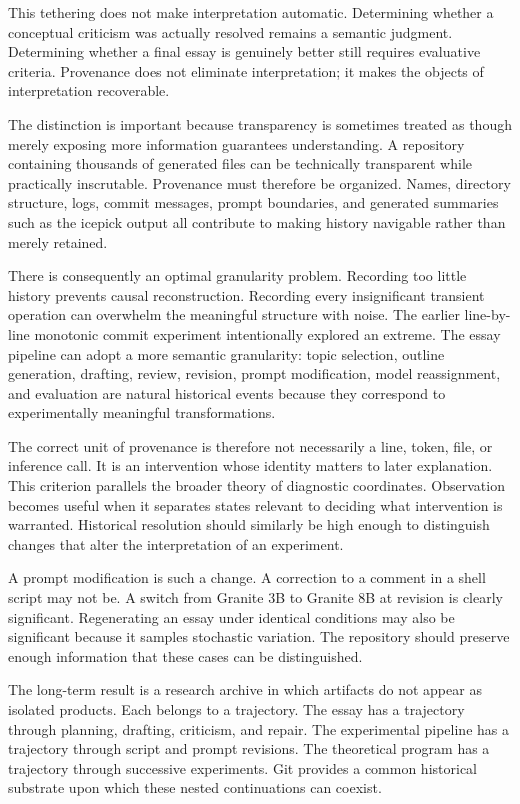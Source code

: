 \documentclass[11pt]{article}
\begin{document}
This tethering does not make interpretation automatic. Determining whether a conceptual criticism was actually resolved remains a semantic judgment. Determining whether a final essay is genuinely better still requires evaluative criteria. Provenance does not eliminate interpretation; it makes the objects of interpretation recoverable.

The distinction is important because transparency is sometimes treated as though merely exposing more information guarantees understanding. A repository containing thousands of generated files can be technically transparent while practically inscrutable. Provenance must therefore be organized. Names, directory structure, logs, commit messages, prompt boundaries, and generated summaries such as the icepick output all contribute to making history navigable rather than merely retained.

There is consequently an optimal granularity problem. Recording too little history prevents causal reconstruction. Recording every insignificant transient operation can overwhelm the meaningful structure with noise. The earlier line-by-line monotonic commit experiment intentionally explored an extreme. The essay pipeline can adopt a more semantic granularity: topic selection, outline generation, drafting, review, revision, prompt modification, model reassignment, and evaluation are natural historical events because they correspond to experimentally meaningful transformations.

The correct unit of provenance is therefore not necessarily a line, token, file, or inference call. It is an intervention whose identity matters to later explanation. This criterion parallels the broader theory of diagnostic coordinates. Observation becomes useful when it separates states relevant to deciding what intervention is warranted. Historical resolution should similarly be high enough to distinguish changes that alter the interpretation of an experiment.

A prompt modification is such a change. A correction to a comment in a shell script may not be. A switch from Granite 3B to Granite 8B at revision is clearly significant. Regenerating an essay under identical conditions may also be significant because it samples stochastic variation. The repository should preserve enough information that these cases can be distinguished.

The long-term result is a research archive in which artifacts do not appear as isolated products. Each belongs to a trajectory. The essay has a trajectory through planning, drafting, criticism, and repair. The experimental pipeline has a trajectory through script and prompt revisions. The theoretical program has a trajectory through successive experiments. Git provides a common historical substrate upon which these nested continuations can coexist.
\end{document}
